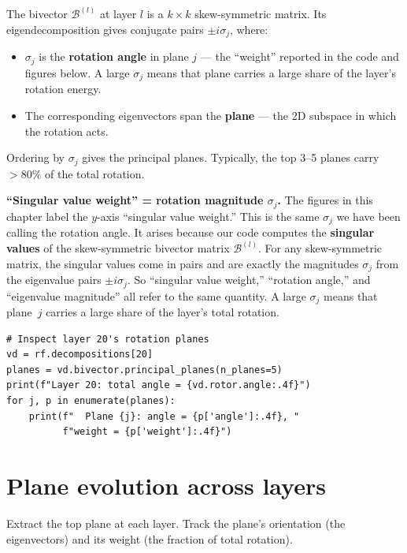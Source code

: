 \documentclass[11pt, twoside, openright]{memoir}
\newcommand{\bivec}[1]{\mathcal{B}^{(#1)}}  %
\numberwithin{equation}{chapter}
\begin{document}
The bivector $\bivec{l}$ at layer $l$ is a $k \times k$ skew-symmetric
matrix.  Its eigendecomposition gives conjugate pairs $\pm i\sigma_j$,
where:
\begin{itemize}[nosep]
\item $\sigma_j$ is the \textbf{rotation angle} in plane $j$ --- the
  ``weight'' reported in the code and figures below.  A large $\sigma_j$
  means that plane carries a large share of the layer's rotation energy.
\item The corresponding eigenvectors span the \textbf{plane} --- the 2D
  subspace in which the rotation acts.
\end{itemize}

Ordering by $\sigma_j$ gives the principal planes.  Typically, the top
3--5 planes carry $>80\%$ of the total rotation.

\begin{pitfall}
\textbf{``Singular value weight'' = rotation magnitude $\sigma_j$.}
The figures in this chapter label the $y$-axis ``singular value
weight.''  This is the same $\sigma_j$ we have been calling the
rotation angle.  It arises because our code computes the
\textbf{singular values} of the skew-symmetric bivector matrix
$\bivec{l}$.  For any skew-symmetric matrix, the singular values come
in pairs and are exactly the magnitudes $\sigma_j$ from the eigenvalue
pairs $\pm i\sigma_j$.  So ``singular value weight,'' ``rotation
angle,'' and ``eigenvalue magnitude'' all refer to the same quantity.
A large $\sigma_j$ means that plane~$j$ carries a large share of the
layer's total rotation.
\end{pitfall}

\begin{lstlisting}[caption={Principal planes of a layer's bivector}]
# Inspect layer 20's rotation planes
vd = rf.decompositions[20]
planes = vd.bivector.principal_planes(n_planes=5)
print(f"Layer 20: total angle = {vd.rotor.angle:.4f}")
for j, p in enumerate(planes):
    print(f"  Plane {j}: angle = {p['angle']:.4f}, "
          f"weight = {p['weight']:.4f}")
\end{lstlisting}

\section{Plane evolution across layers}

Extract the top plane at each layer.  Track the plane's orientation
(the eigenvectors) and its weight (the fraction of total rotation).
\end{document}
